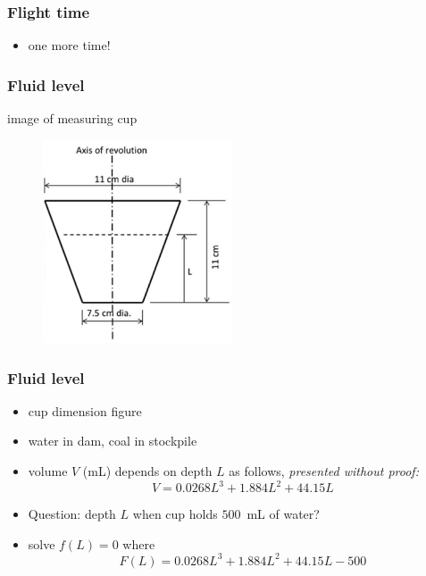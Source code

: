 \documentclass[english,14pt]{beamer}
\begin{document}

\begin{frame}[fragile]

\frametitle{Flight time}

\begin{itemize}
	\item one more time!
\end{itemize}

\end{frame}


\begin{frame}[fragile]

\frametitle{Fluid level}

image of measuring cup

\begin{figure}[ht]
	\centering
	\includegraphics[width=0.5\textwidth]{figures/cupDimensions}
\end{figure}

\end{frame}


\begin{frame}[fragile]

\frametitle{Fluid level}


\begin{itemize}
	\item cup dimension figure
	\item water in dam, coal in stockpile
	\item volume $V$ (mL) depends on depth $L$ as follows, \emph{presented without proof:}
	\[
		V = 0.0268L^3 + 1.884L^2 + 44.15L
	\]
	\item Question: depth $L$ when cup holds $500$~mL of water?
	\item solve $f(L) = 0$ where
	\[
		F(L) = 0.0268L^3 + 1.884L^2 + 44.15L - 500
	\]
\end{itemize}

\end{frame}
\end{document}
